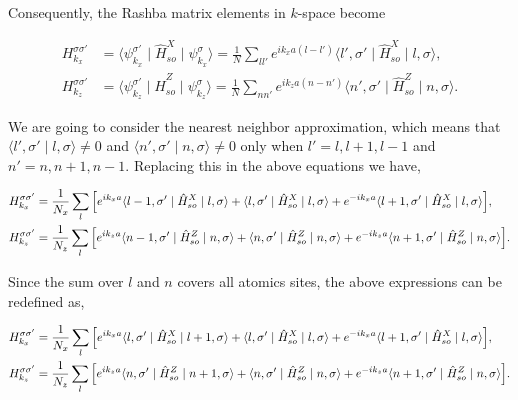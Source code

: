 \documentclass[10pt,prb,showpacs,amssymb,floatfix]{revtex4-1}
\begin{document}
Consequently, the Rashba matrix elements in $k$-space become

\begin{align}
\label{hsox2x}
H_{k_x}^{\sigma \sigma'} &= \langle \psi^{\sigma'}_{k_x} \mid \hat H^X_{so} \mid \psi^\sigma_{k_x} \rangle = \frac{1}{N}\sum_{l l'} e^{i k_x a (l-l')} \langle l',\sigma' \mid \hat{H}^X_{so} \mid l,\sigma\rangle, \\
H_{k_z}^{\sigma \sigma'} &= \langle \psi^{\sigma'}_{k_z} \mid \hat H^Z_{so} \mid \psi^\sigma_{k_z} \rangle = \frac{1}{N}\sum_{n n'} e^{i k_z a (n-n')} \langle n',\sigma' \mid \hat{H}^Z_{so} \mid n,\sigma\rangle.
\label{hsoz2z}
\end{align}


We are going to consider the nearest neighbor approximation, which means that $\langle l',\sigma' \mid l,\sigma\rangle \neq 0$ and $\langle n',\sigma' \mid n,\sigma\rangle \neq 0$ only when $l' = l,l+1,l-1$ and $n' = n,n+1,n-1$. Replacing this in the above equations we have,

\begin{align}
H_{k_x}^{\sigma \sigma'} &= \frac{1}{N_x}\sum_{l} \Big{[} e^{i k_x a} \langle l-1,\sigma' \mid \hat{H}^X_{so} \mid l,\sigma\rangle +  \langle l,\sigma' \mid \hat{H}^X_{so} \mid l,\sigma\rangle + e^{-i k_x a} \langle l+1,\sigma' \mid \hat{H}^X_{so} \mid l,\sigma\rangle \Big{]}, \\
H_{k_z}^{\sigma \sigma'} &= \frac{1}{N_z}\sum_{l} \Big{[} e^{i k_z a} \langle n-1,\sigma' \mid \hat{H}^Z_{so} \mid n,\sigma\rangle +  \langle n,\sigma' \mid \hat{H}^Z_{so} \mid n,\sigma\rangle + e^{-i k_z a} \langle n+1,\sigma' \mid \hat{H}^Z_{so} \mid n,\sigma\rangle \Big{]}.
\label{hsox3xz}
\end{align}

Since the sum over $l$ and $n$ covers all atomics sites, the above expressions can be redefined as,

\begin{align}
\label{hsox4xz}
H_{k_x}^{\sigma \sigma'} &= \frac{1}{N_x}\sum_{l} \Big{[} e^{i k_x a} \langle l,\sigma' \mid \hat{H}^X_{so} \mid l+1,\sigma\rangle +  \langle l,\sigma' \mid \hat{H}^X_{so} \mid l,\sigma\rangle + e^{-i k_x a} \langle l+1,\sigma' \mid \hat{H}^X_{so} \mid l,\sigma\rangle \Big{]}, \\
H_{k_z}^{\sigma \sigma'} &= \frac{1}{N_z}\sum_{l} \Big{[} e^{i k_z a} \langle n,\sigma' \mid \hat{H}^Z_{so} \mid n+1,\sigma\rangle +  \langle n,\sigma' \mid \hat{H}^Z_{so} \mid n,\sigma\rangle + e^{-i k_z a} \langle n+1,\sigma' \mid \hat{H}^Z_{so} \mid n,\sigma\rangle \Big{]}.
\label{hsoz4xz}
\end{align}
\end{document}
